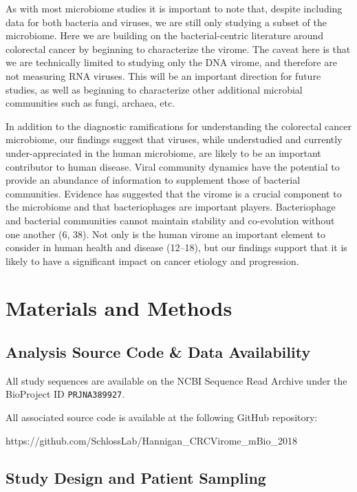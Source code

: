 \documentclass[12pt,]{article}
\begin{document}
As with most microbiome studies it is important to note that, despite
including data for both bacteria and viruses, we are still only studying
a subset of the microbiome. Here we are building on the
bacterial-centric literature around colorectal cancer by beginning to
characterize the virome. The caveat here is that we are technically
limited to studying only the DNA virome, and therefore are not measuring
RNA viruses. This will be an important direction for future studies, as
well as beginning to characterize other additional microbial communities
such as fungi, archaea, etc.

In addition to the diagnostic ramifications for understanding the
colorectal cancer microbiome, our findings suggest that viruses, while
understudied and currently under-appreciated in the human microbiome,
are likely to be an important contributor to human disease. Viral
community dynamics have the potential to provide an abundance of
information to supplement those of bacterial communities. Evidence has
suggested that the virome is a crucial component to the microbiome and
that bacteriophages are important players. Bacteriophage and bacterial
communities cannot maintain stability and co-evolution without one
another (6, 38). Not only is the human virome an important element to
consider in human health and disease (12--18), but our findings support
that it is likely to have a significant impact on cancer etiology and
progression.

\section{Materials and Methods}\label{materials-and-methods}

\subsection{Analysis Source Code \& Data
Availability}\label{analysis-source-code-data-availability}

All study sequences are available on the NCBI Sequence Read Archive
under the BioProject ID \texttt{PRJNA389927}.

All associated source code is available at the following GitHub
repository:

https://github.com/SchlossLab/Hannigan\_CRCVirome\_mBio\_2018

\subsection{Study Design and Patient
Sampling}\label{study-design-and-patient-sampling}
\end{document}
